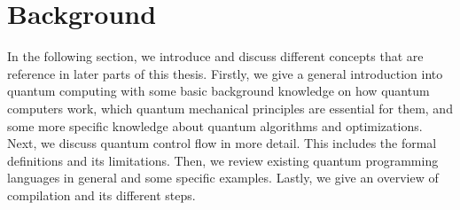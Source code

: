 \chapter{Background}
\label{ch:background}
In the following section, we introduce and discuss different concepts that are reference in later parts of this thesis. Firstly, we give a general introduction into quantum computing with some basic background knowledge on how quantum computers work, which quantum mechanical principles are essential for them, and some more specific knowledge about quantum algorithms and optimizations. Next, we discuss quantum control flow in more detail. This includes the formal definitions and its limitations. Then, we review existing quantum programming languages in general and some specific examples. Lastly, we give an overview of compilation and its different steps. 







